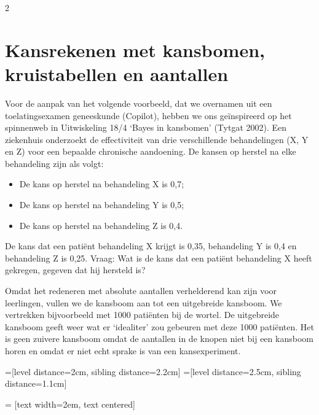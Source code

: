 \begin{multicols} {2}
\section{Kansrekenen met kansbomen, kruistabellen en aantallen}
Voor de aanpak van het volgende voorbeeld, dat we overnamen uit een toelatingsexamen geneeskunde (Copilot), hebben we ons geïnspireerd op het spinnenweb in Uitwiskeling 18/4 ‘Bayes in kansbomen’ (Tytgat 2002).
Een ziekenhuis onderzoekt de effectiviteit van drie verschillende behandelingen (X, Y en Z) voor een bepaalde chronische aandoening. De kansen op herstel na elke behandeling zijn als volgt:
\begin{itemize}
    \item De kans op herstel na behandeling X is 0,7;
    \item De kans op herstel na behandeling Y is 0,5;
    \item De kans op herstel na behandeling Z is 0,4.
\end{itemize}
De kans dat een patiënt behandeling X krijgt is 0,35, behandeling Y is 0,4 en behandeling Z is 0,25.
Vraag: Wat is de kans dat een patiënt behandeling X heeft gekregen, gegeven dat hij hersteld is?

Omdat het redeneren met absolute aantallen verhelderend kan zijn voor leerlingen, vullen we de kansboom aan tot een uitgebreide kansboom. We vertrekken bijvoorbeeld met 1000 patiënten bij de wortel. De uitgebreide kansboom geeft weer wat er ‘idealiter’ zou gebeuren met deze 1000 patiënten. Het is geen zuivere kansboom omdat de aantallen in de knopen niet bij een kansboom horen en omdat er niet echt sprake is van een kansexperiment.


=[level distance=2cm, sibling distance=2.2cm]
=[level distance=2.5cm, sibling distance=1.1cm]

 = [text width=2em, text centered]






\end{multicols}
